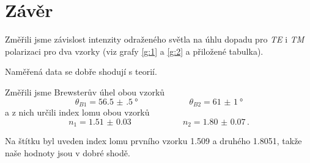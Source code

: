 \section*{Závěr}
Změřili jsme závislost intenzity odraženého světla na úhlu dopadu pro \emph{TE} i \emph{TM} polarizaci pro dva vzorky (viz grafy \ref{g:1} a \ref{g:2} a přiložené tabulka).

Naměřená data se dobře shodují s teorií.

Změřili jsme Brewsterův úhel obou vzorků
\begin{equation*}
\theta_{B1} = \SI{56.5(5)}{\degree} \qquad \qquad \qquad \theta_{B2} = \SI{61(1)}{\degree}
\end{equation*}
a z nich určili index lomu obou vzorků
\begin{equation*}
n_1 = \num{1.51(3)} \qquad \qquad \qquad n_2 = \num{1.80(7)} \,.
\end{equation*}

Na štítku byl uveden index lomu prvního vzorku \num{1.509} a druhého \num{1.8051}, takže naše hodnoty jsou v dobré shodě.